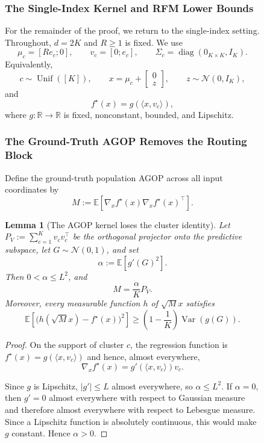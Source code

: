 \documentclass{article}
\newcounter{setting}[section]
\newtheorem{lemma}[lemma]{Lemma}
\begin{document}
\begin{figure}
\subsubsection{The Single-Index Kernel and RFM Lower Bounds}

For the remainder of the proof, we return to the single-index setting.
Throughout, $d=2K$ and $R\geq1$ is fixed. We use
\[
    \mu_c=[Re_c;0],
    \qquad
    v_c=[0;e_c],
    \qquad
    \Sigma_c=\operatorname{diag}(0_{K\times K},I_K).
\]
Equivalently,
\[
    c\sim\operatorname{Unif}([K]),
    \qquad
    x=\mu_c+
    \begin{bmatrix}
        0\\
        z
    \end{bmatrix},
    \qquad
    z\sim\mathcal N(0,I_K),
\]
and
\[
    f^\star(x)=g(\langle x,v_c\rangle),
\]
where $g:\mathbb R\to\mathbb R$ is fixed, nonconstant, bounded, and
Lipschitz.



\subsubsection{The Ground-Truth AGOP Removes the Routing Block}


Define the ground-truth population AGOP across all input
coordinates by
\[
    M
    :=\mathbb E\left[
        \nabla_x f^\star(x)\nabla_x f^\star(x)^\top
      \right].
\]

\begin{lemma}[The AGOP kernel loses the cluster identity]
\label{lem:ground-truth-agop-loses-routing}
Let $P_V:=\sum_{c=1}^K v_cv_c^\top$ be the orthogonal projector onto the
predictive subspace, let $G\sim\mathcal N(0,1)$, and set
\[
    \alpha:=\mathbb E[g'(G)^2].
\]
Then $0<\alpha\leq L^2$, and
\[
    M=\frac{\alpha}{K}P_V.
\]
Moreover, every measurable function $h$ of $\sqrt Mx$ satisfies
\[
    \mathbb E\left[\bigl(h(\sqrt Mx)-f^\star(x)\bigr)^2\right]
    \geq
    \left(1-\frac1K\right)\operatorname{Var}(g(G)).
\]
\end{lemma}

\begin{proof}
On the support of cluster $c$, the regression function is
$f^\star(x)=g(\langle x,v_c\rangle)$ and hence, almost everywhere,
\[
    \nabla_x f^\star(x)
    =g'(\langle x,v_c\rangle)v_c.
\]

Since $g$ is Lipschitz, $|g'|\leq L$ almost everywhere, so
$\alpha\leq L^2$. If $\alpha=0$, then $g'=0$ almost everywhere with respect
to Gaussian measure and therefore almost everywhere with respect to Lebesgue
measure. Since a Lipschitz function is absolutely continuous, this would make
$g$ constant. Hence $\alpha>0$.


\end{proof}
\end{figure}
\end{document}
